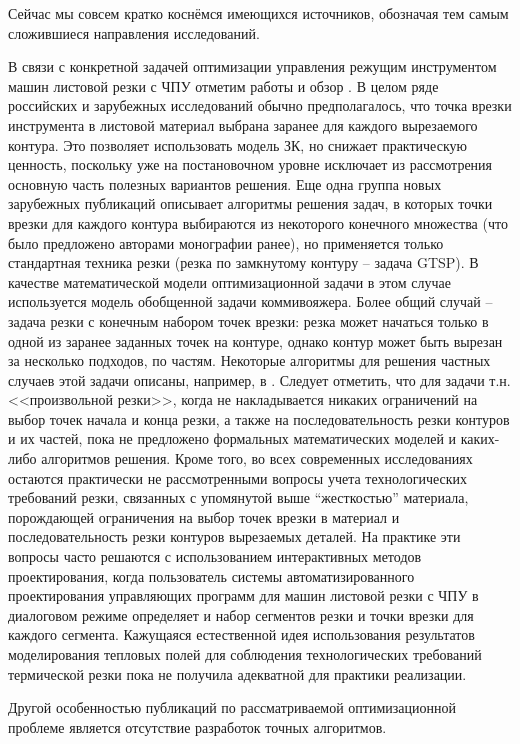 \documentclass[11pt,twoside]{report}
\begin{document}
Сейчас мы совсем кратко коснёмся имеющихся источников,
обозначая тем самым сложившиеся направления исследований.

В связи с конкретной задачей оптимизации управления
режущим инструментом машин листовой резки с ЧПУ
отметим работы
\cite{intro03,intro04,intro05,intro06,intro07,intro08,intro09,Cha10`,intro11,intro12}
и обзор \cite{intro13}.
В целом ряде российских и зарубежных исследований обычно предполагалось,
что точка врезки инструмента в листовой материал
выбрана заранее для каждого вырезаемого контура.
Это позволяет использовать модель ЗК,
но снижает практическую ценность,
поскольку уже на постановочном уровне
исключает из рассмотрения основную часть
полезных вариантов решения.
Еще одна группа новых зарубежных публикаций
описывает алгоритмы решения задач,
в которых точки врезки для каждого контура
выбираются из некоторого конечного множества
(что было предложено авторами монографии ранее),
но применяется только стандартная техника резки
(резка по замкнутому контуру – задача GTSP).
В качестве математической модели оптимизационной задачи
в этом случае используется модель обобщенной задачи коммивояжера.
Более общий случай – задача резки с конечным набором точек врезки:
резка может начаться только в одной из заранее заданных точек на контуре,
однако контур может быть вырезан за несколько подходов,
по частям.
Некоторые алгоритмы для решения частных случаев
этой задачи описаны, например,
в \cite{intro12,intro14}.
Следует отметить, что для задачи т.н. <<произвольной резки>>,
когда не накладывается никаких ограничений
на выбор точек начала и конца резки,
а также на последовательность резки контуров и их частей,
пока не предложено формальных математических моделей
и каких-либо алгоритмов решения.
Кроме того, во всех современных исследованиях
остаются практически не рассмотренными
вопросы учета технологических требований резки,
связанных с упомянутой выше “жесткостью” материала,
порождающей ограничения на выбор точек врезки в материал
и последовательность резки контуров вырезаемых деталей.
На практике эти вопросы часто решаются
с использованием интерактивных методов проектирования,
когда пользователь системы автоматизированного проектирования
управляющих программ для машин листовой резки с ЧПУ
в диалоговом режиме определяет и набор сегментов резки
и точки врезки для каждого сегмента.
Кажущаяся естественной идея использования результатов
моделирования тепловых полей для соблюдения
технологических требований термической резки
пока не получила адекватной для практики реализации.

Другой особенностью публикаций
по рассматриваемой оптимизационной проблеме
является отсутствие разработок точных алгоритмов.
\end{document}
